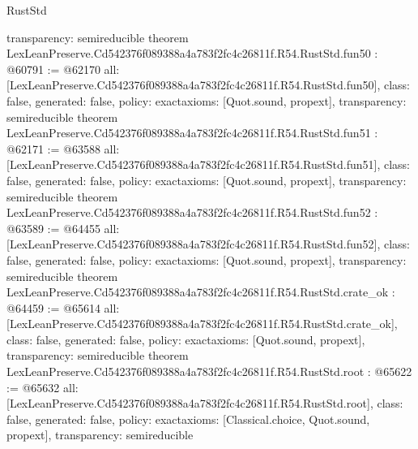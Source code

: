 \begin{lexlean}{RustStd}
\begin{coremodule}
{  transparency: semireducible
}
theorem LexLeanPreserve.Cd542376f089388a4a783f2fc4c26811f.R54.RustStd.fun50 : @60791 := @62170 {
  all: [LexLeanPreserve.Cd542376f089388a4a783f2fc4c26811f.R54.RustStd.fun50],
  class: false,
  generated: false,
  policy: exact{axioms: [Quot.sound, propext]},
  transparency: semireducible
}
theorem LexLeanPreserve.Cd542376f089388a4a783f2fc4c26811f.R54.RustStd.fun51 : @62171 := @63588 {
  all: [LexLeanPreserve.Cd542376f089388a4a783f2fc4c26811f.R54.RustStd.fun51],
  class: false,
  generated: false,
  policy: exact{axioms: [Quot.sound, propext]},
  transparency: semireducible
}
theorem LexLeanPreserve.Cd542376f089388a4a783f2fc4c26811f.R54.RustStd.fun52 : @63589 := @64455 {
  all: [LexLeanPreserve.Cd542376f089388a4a783f2fc4c26811f.R54.RustStd.fun52],
  class: false,
  generated: false,
  policy: exact{axioms: [Quot.sound, propext]},
  transparency: semireducible
}
theorem LexLeanPreserve.Cd542376f089388a4a783f2fc4c26811f.R54.RustStd.crate_ok : @64459 := @65614 {
  all: [LexLeanPreserve.Cd542376f089388a4a783f2fc4c26811f.R54.RustStd.crate_ok],
  class: false,
  generated: false,
  policy: exact{axioms: [Quot.sound, propext]},
  transparency: semireducible
}
theorem LexLeanPreserve.Cd542376f089388a4a783f2fc4c26811f.R54.RustStd.root : @65622 := @65632 {
  all: [LexLeanPreserve.Cd542376f089388a4a783f2fc4c26811f.R54.RustStd.root],
  class: false,
  generated: false,
  policy: exact{axioms: [Classical.choice, Quot.sound, propext]},
  transparency: semireducible
}


\end{coremodule}
\end{lexlean}

